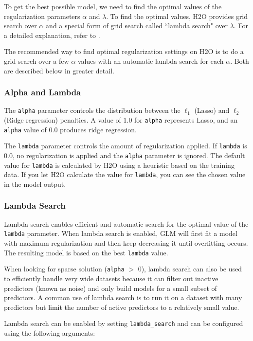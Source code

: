 To get the best possible model, we need to find the optimal values of the regularization parameters $\alpha$ and
$\lambda$.  To find the optimal values, H2O provides grid search over $\alpha$ and a special form of grid search
called ``lambda search" over $\lambda$. For a detailed explanation, refer to {\textbf{}}.

The recommended way to find optimal regularization settings on H2O is to do
a grid search over a few $\alpha$ values with an automatic lambda search for each $\alpha$. Both are described
below in greater detail.

\subsubsection{Alpha and Lambda}

The \texttt{alpha} parameter controls the distribution between  the $\ell_1$ (Lasso) and  $\ell_2$ (Ridge regression) penalties.  A value of 1.0 for \texttt{alpha} 
 represents Lasso, and an \texttt{alpha} value of 0.0 produces ridge regression.

The \texttt{lambda} parameter controls the amount of regularization applied.  If \texttt{lambda} is 0.0, no 
regularization is applied and the \texttt{alpha} parameter is ignored.  The default value for \texttt{lambda} is
calculated by H2O using a heuristic based on the training data.  If you let H2O calculate the value for \texttt{lambda}, you can see the chosen value in the model output.

\subsubsection{Lambda Search}
Lambda search enables efficient and automatic search for the optimal value of the \texttt{lambda} parameter. When lambda search is enabled, GLM will first fit a model with maximum regularization and then keep decreasing it until overfitting occurs. The resulting model is based on the best \texttt{lambda} value. 

When looking for sparse solution (\texttt{alpha} $>$ 0), lambda search can also be used to efficiently handle very wide datasets because it can filter out inactive predictors (known as noise) and only build models for a small subset of predictors. A common use of lambda search is to run it on a dataset with many predictors but limit the number of active predictors to a relatively small value.  

Lambda search can be enabled by setting \texttt{lambda\_search} and can be configured using the following arguments:

